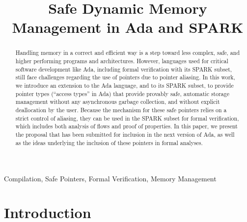 \documentclass{llncs}
\begin{document}

\title{Safe Dynamic Memory Management in Ada and SPARK}

\maketitle
\begin{abstract}
Handling memory in a correct and efficient way is a step toward less complex, safe, and higher performing programs and architectures. However, languages used for critical software development like Ada, including formal verification with its SPARK subset, still face challenges regarding the use of pointers due to pointer aliasing. In this work, we introduce an extension to the Ada language, and to its SPARK subset, to provide pointer types (``access types'' in Ada) that provide provably safe, automatic storage management without any asynchronous garbage collection, and without explicit deallocation by the user. Because the mechanism for these safe pointers relies on a strict control of aliasing, they can be used in the SPARK subset for formal verification, which includes both analysis of flows and proof of properties. In this paper, we present the proposal that has been submitted for inclusion in the next version of Ada, as well as the ideas underlying the inclusion of these pointers in formal analyses.
\end{abstract}



\keywords 

Compilation, Safe Pointers, Formal Verification, Memory Management


\section{Introduction}
\end{document}
